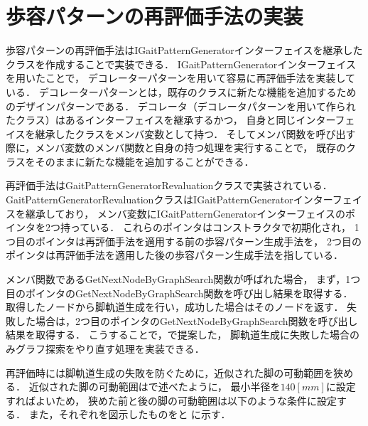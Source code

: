 \section{歩容パターンの再評価手法の実装}
歩容パターンの再評価手法はIGaitPatternGeneratorインターフェイスを継承したクラスを作成することで実装できる．
IGaitPatternGeneratorインターフェイスを用いたことで，
デコレーターパターンを用いて容易に再評価手法を実装している．
デコレーターパターンとは，既存のクラスに新たな機能を追加するためのデザインパターンである．
デコレータ（デコレータパターンを用いて作られたクラス）はあるインターフェイスを継承するかつ，
自身と同じインターフェイスを継承したクラスをメンバ変数として持つ．
そしてメンバ関数を呼び出す際に，メンバ変数のメンバ関数と自身の持つ処理を実行することで，
既存のクラスをそのままに新たな機能を追加することができる．

再評価手法はGaitPatternGeneratorRevaluationクラスで実装されている．
GaitPatternGeneratorRevaluationクラスはIGaitPatternGeneratorインターフェイスを継承しており，
メンバ変数にIGaitPatternGeneratorインターフェイスのポインタを2つ持っている．
これらのポインタはコンストラクタで初期化され，
1つ目のポインタは再評価手法を適用する前の歩容パターン生成手法を，
2つ目のポインタは再評価手法を適用した後の歩容パターン生成手法を指している．

メンバ関数であるGetNextNodeByGraphSearch関数が呼ばれた場合，
まず，1つ目のポインタのGetNextNodeByGraphSearch関数を呼び出し結果を取得する．
取得したノードから脚軌道生成を行い，成功した場合はそのノードを返す．
失敗した場合は，2つ目のポインタのGetNextNodeByGraphSearch関数を呼び出し結果を取得する．
こうすることで，で提案した，
脚軌道生成に失敗した場合のみグラフ探索をやり直す処理を実装できる．

再評価時には脚軌道生成の失敗を防ぐために，近似された脚の可動範囲を狭める．
近似された脚の可動範囲はで述べたように，
最小半径を$140 [mm]$に設定すればよいため，
狭めた前と後の脚の可動範囲は以下のような条件に設定する．
また，それぞれを図示したものをと
に示す．

